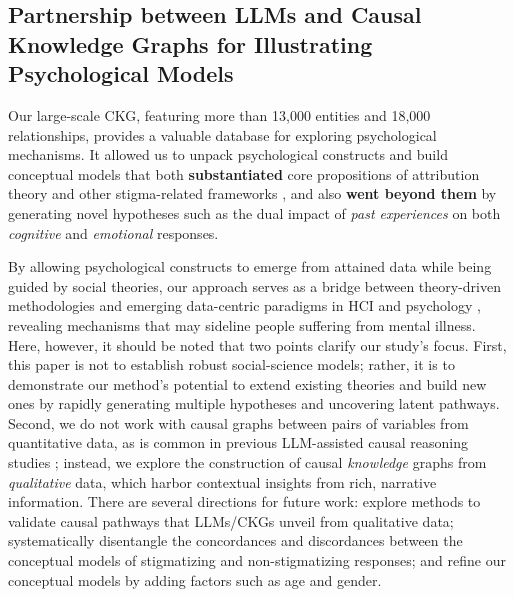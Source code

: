 \subsection{Partnership between LLMs and Causal Knowledge Graphs for Illustrating Psychological Models} %

Our large-scale CKG, featuring more than 13,000 entities and 18,000 relationships, provides a valuable database for exploring psychological mechanisms. 
It allowed us to unpack psychological constructs and build conceptual models that both \textbf{substantiated} core propositions of attribution theory \cite{attribution_theory_corrigan_2000} and other stigma-related frameworks \cite{belief_reviewer_peter_2021, personality_reviewer_steiger_2022, motivational_reviewer_kvaale_2016}, and also \textbf{went beyond them} by generating novel hypotheses such as the dual impact of \textit{past experiences} on both \textit{cognitive} and \textit{emotional} responses.



By allowing psychological constructs to emerge from attained data while being guided by social theories, our approach serves as a bridge between theory-driven methodologies and emerging data-centric paradigms in HCI and psychology \cite{ckg_llm_tong_2024}, revealing mechanisms that may sideline people suffering from mental illness.
Here, however, it should be noted that two points clarify our study's focus.
First, this paper is not to establish robust social-science models; rather, it is to demonstrate our method's potential to extend existing theories and build new ones by rapidly generating multiple hypotheses and uncovering latent pathways. 
Second, we do not work with causal graphs between pairs of variables from quantitative data, as is common in previous LLM-assisted causal reasoning studies \cite{ckg_llm_kiciman_2024, kg_psych_crielaard_2022}; instead, we explore the construction of causal \textit{knowledge} graphs from \textit{qualitative} data, which harbor contextual insights from rich, narrative information.
There are several directions for future work: explore methods to validate causal pathways that LLMs/CKGs unveil from qualitative data; systematically disentangle the concordances and discordances between the conceptual models of stigmatizing and non-stigmatizing responses; and refine our conceptual models by adding factors such as age and gender.


